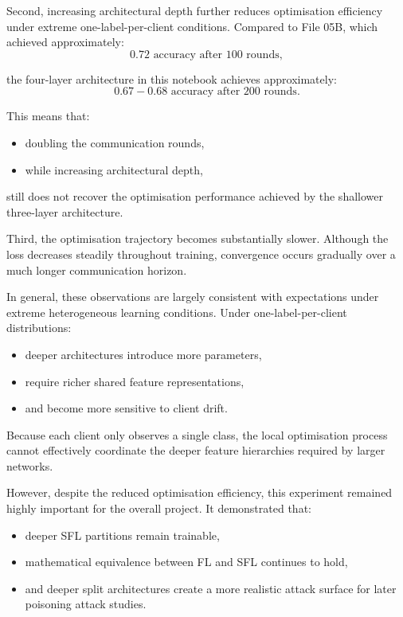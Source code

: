 Second, increasing architectural depth further reduces optimisation efficiency under extreme one-label-per-client conditions. Compared to File 05B, which achieved approximately:
\[
0.72 \text{ accuracy after } 100 \text{ rounds},
\]

the four-layer architecture in this notebook achieves approximately:
\[
0.67 - 0.68 \text{ accuracy after } 200 \text{ rounds}.
\]

This means that:
\begin{itemize}
    \item doubling the communication rounds,
    \item while increasing architectural depth,
\end{itemize}

still does not recover the optimisation performance achieved by the shallower three-layer architecture.

Third, the optimisation trajectory becomes substantially slower. Although the loss decreases steadily throughout training, convergence occurs gradually over a much longer communication horizon.

In general, these observations are largely consistent with expectations under extreme heterogeneous learning conditions. Under one-label-per-client distributions:
\begin{itemize}
    \item deeper architectures introduce more parameters,
    \item require richer shared feature representations,
    \item and become more sensitive to client drift.
\end{itemize}

Because each client only observes a single class, the local optimisation process cannot effectively coordinate the deeper feature hierarchies required by larger networks.

However, despite the reduced optimisation efficiency, this experiment remained highly important for the overall project. It demonstrated that:
\begin{itemize}
    \item deeper SFL partitions remain trainable,
    \item mathematical equivalence between FL and SFL continues to hold,
    \item and deeper split architectures create a more realistic attack surface for later poisoning attack studies.
\end{itemize}

